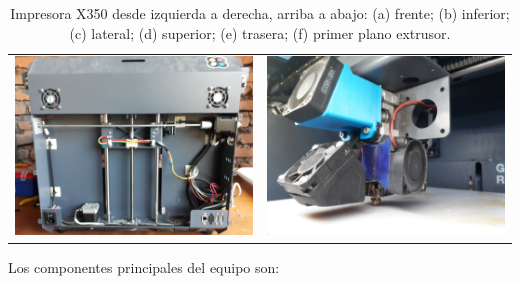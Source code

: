 \begin{table}[H]
\begin{tabular}{p{6cm}p{6cm}}
\includegraphics[scale=0.04]{images/x350tras.jpg} & \includegraphics[scale=0.04]{images/x350ext.jpg}\\

\end{tabular}
\caption{Impresora X350 desde izquierda a derecha, arriba a abajo: (a) frente; (b) inferior; (c) lateral; (d) superior; (e) trasera; (f) primer plano extrusor.}
\end{table}

Los componentes principales del equipo son:

